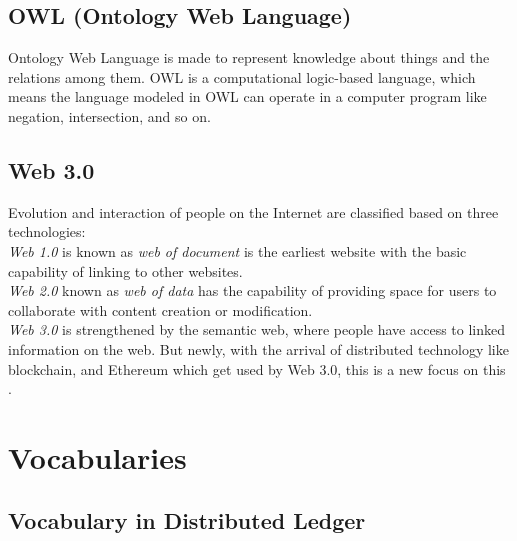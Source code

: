 \subsection{OWL (Ontology Web Language) }
Ontology Web Language is made to represent knowledge about things and the relations among them. OWL is a computational logic-based language, which means the language modeled in OWL can operate in a computer program like negation, intersection, and so on\cite{Hector}.
\subsection{Web 3.0}
Evolution and interaction of people on the Internet are classified based on three technologies:\\
\textit{Web 1.0} is known as \textit{web of document} is the earliest website with the basic capability of linking to other websites.\\
\textit{Web 2.0} known as \textit{web of data} has the capability of providing space for users to collaborate with content creation or modification.\\
\textit{Web 3.0} is strengthened by the semantic web, where people have access to linked information on the web. But newly, with the arrival of distributed technology like blockchain, and Ethereum which get used by Web 3.0, this is a new focus on this \cite{Chhetri}.
\section{Vocabularies}
\subsection{Vocabulary in Distributed Ledger}


